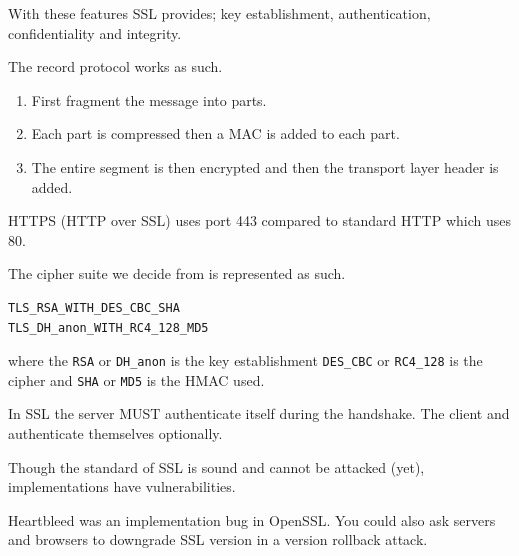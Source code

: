 \documentclass{report}
\begin{document}
With these features SSL provides; key establishment, authentication,
confidentiality and integrity.

The record protocol works as such.
\begin{enumerate}
    \item First fragment the message into parts.
    \item Each part is compressed then a MAC is added to each part.
    \item The entire segment is then encrypted and then the transport
        layer header is added.
\end{enumerate}

HTTPS (HTTP over SSL) uses port 443 compared to standard HTTP which uses 80.

The cipher suite we decide from is represented as such.
\begin{verbatim}
TLS_RSA_WITH_DES_CBC_SHA
TLS_DH_anon_WITH_RC4_128_MD5
\end{verbatim}

where the \texttt{RSA} or \texttt{DH\_anon} is the key establishment
\texttt{DES\_CBC} or \texttt{RC4\_128} is the cipher and
\texttt{SHA} or \texttt{MD5} is the HMAC used.

In SSL the server MUST authenticate itself during the handshake. The client and
authenticate themselves optionally.

Though the standard of SSL is sound and cannot be attacked (yet),
implementations have vulnerabilities.

Heartbleed was an implementation bug in OpenSSL\@.
You could also ask servers and browsers to downgrade SSL version in a
version rollback attack.
\end{document}
